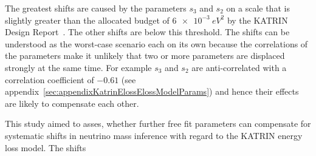 The greatest shifts are caused by the parameters $s_3$ and $s_2$ on a scale that is slightly greater than the allocated budget of $\SI{6e-3}{eV^2}$ by the KATRIN Design Report~\cite{Angrik:2005ep}. The other shifts are below this threshold. The shifts can be understood as the worst-case scenario each on its own because the correlations of the parameters make it unlikely that two or more parameters are displaced strongly at the same time. For example $s_3$ and $s_2$ are anti-correlated with a correlation coefficient of $-0.61$ (see appendix~\ref{sec:appendixKatrinElossElossModelParams}) and hence their effects are likely to compensate each other.

This study aimed to asses, whether further free fit parameters can compensate for systematic shifts in neutrino mass inference with regard to the KATRIN energy loss model. The shifts 

